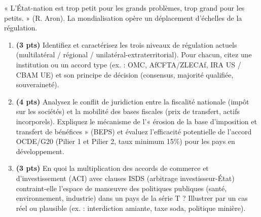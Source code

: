 \documentclass[11pt]{article}
\begin{document}
\begin{exercice}
« L'État-nation est trop petit pour les grands problèmes, trop grand pour les petits. » (R. Aron). La mondialisation opère un déplacement d'échelles de la régulation.

\begin{enumerate}
    \item \textbf{(3 pts)} Identifiez et caractérisez les trois niveaux de régulation actuels (multilatéral / régional / unilatéral-extraterritorial). Pour chacun, citez une institution ou un accord type (ex. : OMC, AfCFTA/ZLECAf, IRA US / CBAM UE) et son principe de décision (consensus, majorité qualifiée, souveraineté).
    \item \textbf{(4 pts)} Analysez le conflit de juridiction entre la fiscalité nationale (impôt sur les sociétés) et la mobilité des bases fiscales (prix de transfert, actifs incorporels). Expliquez le mécanisme de l'« érosion de la base d'imposition et transfert de bénéfices » (BEPS) et évaluez l'efficacité potentielle de l'accord OCDE/G20 (Pilier 1 et Pilier 2, taux minimum 15\%) pour les pays en développement.
    \item \textbf{(3 pts)} En quoi la multiplication des accords de commerce et d'investissement (ACI) avec clauses ISDS (arbitrage investisseur-État) contraint-elle l'espace de manœuvre des politiques publiques (santé, environnement, industrie) dans un pays de la série T ? Illustrer par un cas réel ou plausible (ex. : interdiction amiante, taxe soda, politique minière).
\end{enumerate}
\end{exercice}
\end{document}
